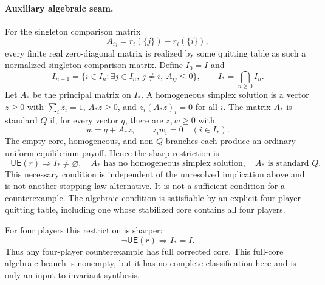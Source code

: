 \documentclass[11pt]{article}
\newcommand{\UE}{\mathsf{UE}}
\begin{document}
\paragraph{Auxiliary algebraic seam.}
For the singleton comparison matrix
\[
 A_{ij}=r_i(\{j\})-r_i(\{i\}),
\]
every finite real zero-diagonal matrix is realized by some quitting table as
such a normalized singleton-comparison matrix.  Define $I_0=I$ and
\[
 I_{n+1}=\{i\in I_n:\exists j\in I_n,
      \ j\ne i,\ A_{ij}\le0\},
 \qquad I_*=\bigcap_{n\ge0}I_n.
\]
Let $A_*$ be the principal matrix on $I_*$.  A homogeneous simplex solution
is a vector $z\ge0$ with $\sum_i z_i=1$, $A_*z\ge0$, and
$z_i(A_*z)_i=0$ for all $i$.  The matrix $A_*$ is standard $Q$ if, for every
vector $q$, there are $z,w\ge0$ with
\[
 w=q+A_*z,
 \qquad z_iw_i=0\quad(i\in I_*).
\]
The empty-core, homogeneous, and non-$Q$ branches each produce an ordinary
uniform-equilibrium payoff.  Hence the sharp restriction is
\[
 \boxed{
 \neg\UE(r)\Longrightarrow
 I_*\ne\varnothing,\quad
 A_*\text{ has no homogeneous simplex solution},\quad
 A_*\text{ is standard }Q.}
\]
This necessary condition is independent of the unresolved implication above
and is not another stopping-law alternative.  It is not a sufficient
condition for a counterexample.  The algebraic condition is satisfiable by
an explicit four-player quitting table, including one whose stabilized core
contains all four players.

For four players this restriction is sharper:
\[
 \boxed{\neg\UE(r)\Longrightarrow I_*=I.}
\]
Thus any four-player counterexample has full corrected core.  This full-core
algebraic branch is nonempty, but it has no complete classification here and
is only an input to invariant synthesis.
\end{document}
